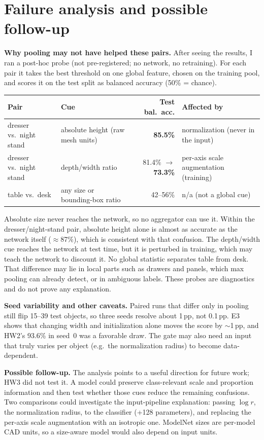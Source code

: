 \documentclass[10pt]{article}
\begin{document}
\section{Failure analysis and possible follow-up}
\textbf{Why pooling may not have helped these pairs.} After seeing the results, I ran a post-hoc probe (not pre-registered; no network, no retraining). For each pair it takes the best threshold on one global feature, chosen on the training pool, and scores it on the test split as balanced accuracy (50\% = chance).
\begin{center}\small
\begin{tabular}{llrl}
\toprule
Pair & Cue & Test bal.\ acc. & Affected by\\
\midrule
dresser vs.\ night stand & absolute height (raw mesh units) & \textbf{85.5\%} & normalization (never in the input)\\
dresser vs.\ night stand & depth/width ratio & 81.4\% $\to$ \textbf{73.3\%} & per-axis scale augmentation (training)\\
table vs.\ desk & any size or bounding-box ratio & 42--56\% & n/a (not a global cue)\\
\bottomrule
\end{tabular}
\end{center}
\vspace{-3pt}
Absolute size never reaches the network, so no aggregator can use it. Within the dresser/night-stand pair, absolute height alone is almost as accurate as the network itself ($\approx$87\%), which is consistent with that confusion. The depth/width cue reaches the network at test time, but it is perturbed in training, which may teach the network to discount it. No global statistic separates table from desk. That difference may lie in local parts such as drawers and panels, which max pooling can already detect, or in ambiguous labels. These probes are diagnostics and do not prove any explanation.

\textbf{Seed variability and other caveats.} Paired runs that differ only in pooling still flip 15--39 test objects, so three seeds resolve about 1\,pp, not 0.1\,pp. E3 shows that changing width and initialization alone moves the score by $\sim$1\,pp, and HW2's 93.6\% in seed~0 was a favorable draw. The gate may also need an input that truly varies per object (e.g.\ the normalization radius) to become data-dependent.

\textbf{Possible follow-up.} The analysis points to a useful direction for future work; HW3 did not test it. A model could preserve class-relevant scale and proportion information and then test whether those cues reduce the remaining confusions. Two comparisons could investigate the input-pipeline explanation: passing $\log r$, the normalization radius, to the classifier (+128 parameters), and replacing the per-axis scale augmentation with an isotropic one. ModelNet sizes are per-model CAD units, so a size-aware model would also depend on input units.
\end{document}
